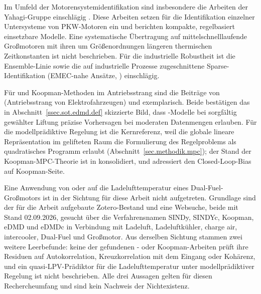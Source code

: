 Im Umfeld der Motorensystemidentifikation sind insbesondere die Arbeiten
der Yahagi-Gruppe einschlägig \cite{yahagiSparseIdentificationNonlinear,
yahagiSparseIdentificationNonlinear2025, yonezawaSparseIdentificationNonlinear2025}.
Diese Arbeiten setzen \sindy{} für die Identifikation einzelner
Untersysteme von PKW-Motoren ein und berichten kompakte, regelbasiert
einsetzbare Modelle. Eine systematische Übertragung auf
mittelschnelllaufende Großmotoren mit ihren um Größenordnungen längeren
thermischen Zeitkonstanten ist nicht beschrieben. Für die industrielle
Robustheit ist die Ensemble-Linie
\cite{faselEnsembleSINDyRobustSparse2022} sowie die auf industrielle
Prozesse zugeschnittene Sparse-Identifikation (EMEC-nahe Ansätze,
\cite{bhadrirajuOASISPOperableAdaptive2021}) einschlägig.

Für \edmd{} und Koopman-Methoden im Antriebsstrang sind die Beiträge von
\cite{medaKoopmanBasedMethodsEV2025} (Antriebsstrang von Elektrofahrzeugen)
und \cite{zinageDataDrivenModeling2022} exemplarisch. Beide bestätigen
das in Abschnitt~\ref{ssec.sot.edmd.def} skizzierte Bild, dass
\edmd-Modelle bei sorgfältig gewählter Liftung präzise Vorhersagen bei
moderaten Datenmengen erlauben. Für die modellprädiktive Regelung ist
\cite{kordaLinearPredictorsNonlinear2018} die Kernreferenz, weil die
globale lineare Repräsentation im gelifteten Raum die Formulierung des
Regelproblems als quadratisches Programm erlaubt
(Abschnitt~\ref{sec.methodik.mpc}); der
Stand der Koopman-MPC-Theorie ist in
\cite{strasserOverviewKoopmanbasedControl2026} konsolidiert, und
\cite{dahdahClosedloopKoopmanOperator2024} adressiert den
Closed-Loop-Bias auf Koopman-Seite.

Eine Anwendung von \sindy{} oder \edmd{} auf die Ladelufttemperatur eines
Dual-Fuel-Großmotors ist in der Sichtung für diese Arbeit nicht
aufgetreten. Grundlage sind der für die Arbeit aufgebaute Zotero-Bestand
und eine Websuche, beide mit Stand 02.09.2026, gesucht über die
Verfahrensnamen SINDy, SINDYc, Koopman, eDMD und eDMDc in Verbindung mit
Ladeluft, Ladeluftkühler, charge air, intercooler, Dual-Fuel und
Großmotor. Aus derselben Sichtung stammen zwei weitere Leerbefunde: keine
der gefundenen \sindy- oder Koopman-Arbeiten prüft ihre Residuen auf
Autokorrelation, Kreuzkorrelation mit dem Eingang oder Kohärenz, und ein
quasi-LPV-Prädiktor für die Ladelufttemperatur unter modellprädiktiver
Regelung ist nicht beschrieben. Alle drei Aussagen gelten für diesen
Rechercheumfang und sind kein Nachweis der Nichtexistenz.



